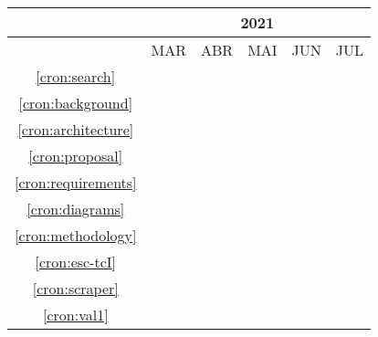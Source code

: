 \begin{table}[!htbp]
    \centering
    \begin{tabular}{|c|c|c|c|c|c|}
        \hline
                                & \multicolumn{5}{c|}{2021}                                                                                         \\
        \hline
                                & MAR                       & ABR                 & MAI                 & JUN                 & JUL                 \\
        \hline
        \ref{cron:search}       & \cellcolor{midgray}       &                     &                     &                     &                     \\
        \hline
        \ref{cron:background}   & \cellcolor{midgray}       &                     &                     &                     &                     \\
        \hline
        \ref{cron:architecture} &                           & \cellcolor{midgray} &                     &                     &                     \\
        \hline
        \ref{cron:proposal}     &                           & \cellcolor{midgray} &                     &                     &                     \\
        \hline
        \ref{cron:requirements} &                           & \cellcolor{midgray} &                     &                     &                     \\
        \hline
        \ref{cron:diagrams}     &                           & \cellcolor{midgray} &                     &                     &                     \\
        \hline
        \ref{cron:methodology}  &                           & \cellcolor{midgray} &                     &                     &                     \\
        \hline
        \ref{cron:esc-tcI}      &                           & \cellcolor{midgray} &                     &                     &                     \\
        \hline
        \ref{cron:scraper}      &                           &                     & \cellcolor{midgray} &                     &                     \\
        \hline
        \ref{cron:val1}         &                           &                     & \cellcolor{midgray} &                     &                     \\

\end{tabular}
\end{table}
